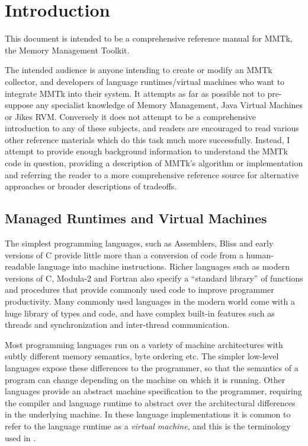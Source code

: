 \chapter{Introduction}

This document is intended to be a comprehensive reference manual for MMTk, the Memory Management Toolkit.

The intended audience is anyone intending to create or modify an MMTk collector, and developers of
language runtimes/virtual machines who want to integrate MMTk into their system.
It attempts as far as possible not to pre-suppose any specialist knowledge of Memory Management, Java
Virtual Machines or Jikes RVM.
Conversely it does not attempt to be a comprehensive introduction to any of these subjects, and
readers are encouraged to read various other reference materials which do this task much more successfully.
Instead, I attempt to provide enough background information to understand the MMTk code in question,
providing a description of MMTk's algorithm or implementation and referring the reader to a more
comprehensive reference source for alternative approaches or broader descriptions of tradeoffs.

\section{Managed Runtimes and Virtual Machines}

The simplest programming languages, such as Assemblers, Bliss and early versions
of C provide little more than a conversion of code from a human-readable language
into machine instructions.  Richer languages such as modern versions of C, Modula-2
and Fortran also specify a ``standard library'' of functions and procedures that
provide commonly used code to improve programmer productivity.  Many commonly used
languages in the modern world come with a huge library of types and code, and have 
complex built-in features such as threads and synchronization and inter-thread
communication.

Most programming languages run on a variety of machine architectures with subtly
different memory semantics, byte ordering etc.  The simpler low-level languages
expose these differences to the programmer, so that the semantics of a program
can change depending on the machine on which it is running.  Other languages
provide an abstract machine specification to the programmer, requiring the compiler
and language runtime to abstract over the architectural differences in the
underlying machine.  In these language implementations it is common to refer
to the language runtime as a \emph{virtual machine}, and this is the terminology
used in \mmtk.

